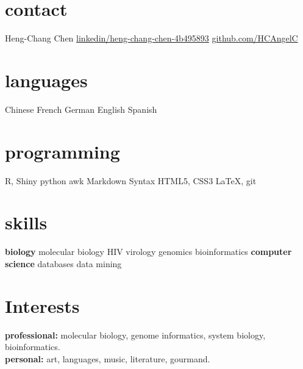\documentclass[]{friggeri-cv} %
\begin{document}



\begin{aside} %
  \section{contact}
  {\FA \faUser}
  Heng-Chang Chen
  {\FA \faLinkedinSign}
  \href{http://www.linkedin.com/in/heng-chang-chen-4b495893}{linkedin/heng-chang-chen-4b495893}
  {\FA \faGithubSign}
  \href{http://github.com/HCAngelC}{github.com/HCAngelC}
  \section{languages}
  Chinese
  French
  German
  English
  Spanish
  \section{programming}
  R, Shiny
  python
  awk
  Markdown
  Syntax
  HTML5, CSS3
  \LaTeX, git 
  \section{skills}
  {\bf biology}
  molecular biology
  HIV virology
  genomics
  bioinformatics
  {\bf computer science}
  databases
  data mining 
\end{aside}


\section{Interests}

\textbf{professional:} molecular biology, genome informatics, system biology, bioinformatics. \\
\textbf{personal:} art, languages, music, literature, gourmand. \\
\end{document}
